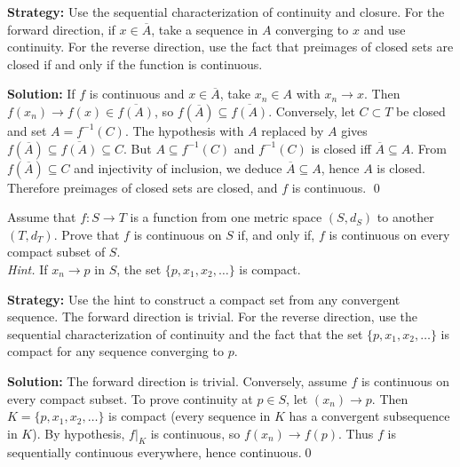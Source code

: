 \noindent\textbf{Strategy:} Use the sequential characterization of continuity and closure. For the forward direction, if $x \in \overline{A}$, take a sequence in $A$ converging to $x$ and use continuity. For the reverse direction, use the fact that preimages of closed sets are closed if and only if the function is continuous.

\bigskip\noindent\textbf{Solution:}
If $f$ is continuous and $x\in\overline{A}$, take $x_n\in A$ with $x_n\to x$. Then $f(x_n)\to f(x)\in\overline{f(A)}$, so $f(\overline{A})\subseteq\overline{f(A)}$. Conversely, let $C\subset T$ be closed and set $A=f^{-1}(C)$. The hypothesis with $A$ replaced by $A$ gives $f(\overline{A})\subseteq\overline{f(A)}\subseteq C$. But $A\subseteq f^{-1}(C)$ and $f^{-1}(C)$ is closed iff $\overline{A}\subseteq A$. From $f(\overline{A})\subseteq C$ and injectivity of inclusion, we deduce $\overline{A}\subseteq A$, hence $A$ is closed. Therefore preimages of closed sets are closed, and $f$ is continuous. \qed



\begin{problembox}
\begin{problemstatement}
Assume that $f : S \rightarrow T$ is a function from one metric space $(S, d_S)$ to another $(T, d_T)$. Prove that $f$ is continuous on $S$ if, and only if, $f$ is continuous on every compact subset of $S$. \\
\textit{Hint.} If $x_n \rightarrow p$ in $S$, the set $\{p, x_1, x_2, \ldots\}$ is compact.
\end{problemstatement}
\end{problembox}

\noindent\textbf{Strategy:} Use the hint to construct a compact set from any convergent sequence. The forward direction is trivial. For the reverse direction, use the sequential characterization of continuity and the fact that the set $\{p, x_1, x_2, \ldots\}$ is compact for any sequence converging to $p$.

\bigskip\noindent\textbf{Solution:}
The forward direction is trivial. Conversely, assume $f$ is continuous on every compact subset. To prove continuity at $p\in S$, let $(x_n)\to p$. Then $K=\{p,x_1,x_2,\ldots\}$ is compact (every sequence in $K$ has a convergent subsequence in $K$). By hypothesis, $f|_K$ is continuous, so $f(x_n)\to f(p)$. Thus $f$ is sequentially continuous everywhere, hence continuous.\qed



